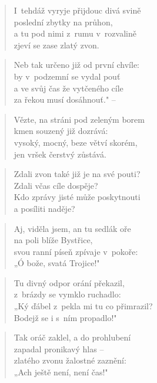 \begin{verse}
I~tehdáž vyryje přijdouc divá svině \\
poslední zbytky na průhon, \\
a tu pod nimi z~rumu v~rozvalině \\
zjeví se zase zlatý zvon.
\end{verse}

\begin{verse}
Neb tak určeno již od první chvíle: \\
by v~podzemní se vydal pouť \\
a ve svůj čas že vytčeného cíle \\
za řekou musí dosáhnouť." --
\end{verse}

\begin{verse}
Vězte, na stráni pod zeleným borem \\
kmen souzený již dozrává: \\
vysoký, mocný, beze větví skorém, \\
jen vršek čerstvý zůstává.
\end{verse}

\begin{verse}
Zdali zvon také již je na své pouti? \\
Zdali včas cíle dospěje? \\
Kdo zprávy jisté může poskytnouti \\
a posíliti naděje?
\end{verse}

\begin{verse}
Aj, viděla jsem, an tu sedlák oře \\
na poli blíže Bystřice, \\
svou ranní píseň zpívaje v~pokoře: \\
„Ó bože, svatá Trojice!"
\end{verse}

\begin{verse}
Tu divný odpor orání překazil, \\
z~brázdy se vymklo ruchadlo: \\
„Ký ďábel z~pekla mi tu co přimrazil? \\
Bodejž se i s~ním propadlo!"
\end{verse}

\begin{verse}
Tak oráč zaklel, a do prohlubení \\
zapadal pronikavý hlas -- \\
zlatého zvonu žalostné zaznění: \\
„Ach ještě není, není čas!"
\end{verse}

